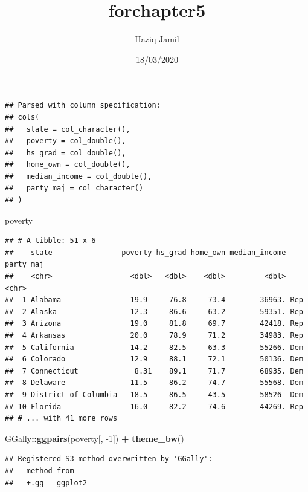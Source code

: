 \documentclass[]{article}
\title{forchapter5}
\author{Haziq Jamil}
\date{18/03/2020}
\newenvironment{Shaded}{\begin{snugshade}}{\end{snugshade}}
\newcommand{\DecValTok}[1]{\textcolor[rgb]{0.00,0.00,0.81}{#1}}
\newcommand{\KeywordTok}[1]{\textcolor[rgb]{0.13,0.29,0.53}{\textbf{#1}}}
\newcommand{\NormalTok}[1]{#1}
\newcommand{\OperatorTok}[1]{\textcolor[rgb]{0.81,0.36,0.00}{\textbf{#1}}}
\newcommand{\StringTok}[1]{\textcolor[rgb]{0.31,0.60,0.02}{#1}}
\begin{document}
\maketitle

\begin{verbatim}
## Parsed with column specification:
## cols(
##   state = col_character(),
##   poverty = col_double(),
##   hs_grad = col_double(),
##   home_own = col_double(),
##   median_income = col_double(),
##   party_maj = col_character()
## )
\end{verbatim}

\begin{Shaded}
\begin{Highlighting}[]
\NormalTok{poverty}
\end{Highlighting}
\end{Shaded}

\begin{verbatim}
## # A tibble: 51 x 6
##    state                poverty hs_grad home_own median_income party_maj
##    <chr>                  <dbl>   <dbl>    <dbl>         <dbl> <chr>    
##  1 Alabama                19.9     76.8     73.4        36963. Rep      
##  2 Alaska                 12.3     86.6     63.2        59351. Rep      
##  3 Arizona                19.0     81.8     69.7        42418. Rep      
##  4 Arkansas               20.0     78.9     71.2        34983. Rep      
##  5 California             14.2     82.5     63.3        55266. Dem      
##  6 Colorado               12.9     88.1     72.1        50136. Dem      
##  7 Connecticut             8.31    89.1     71.7        68935. Dem      
##  8 Delaware               11.5     86.2     74.7        55568. Dem      
##  9 District of Columbia   18.5     86.5     43.5        58526  Dem      
## 10 Florida                16.0     82.2     74.6        44269. Rep      
## # ... with 41 more rows
\end{verbatim}

\begin{Shaded}
\begin{Highlighting}[]
\NormalTok{GGally}\OperatorTok{::}\KeywordTok{ggpairs}\NormalTok{(poverty[, }\DecValTok{-1}\NormalTok{]) }\OperatorTok{+}\StringTok{ }\KeywordTok{theme_bw}\NormalTok{()}
\end{Highlighting}
\end{Shaded}

\begin{verbatim}
## Registered S3 method overwritten by 'GGally':
##   method from   
##   +.gg   ggplot2
\end{verbatim}
\end{document}
